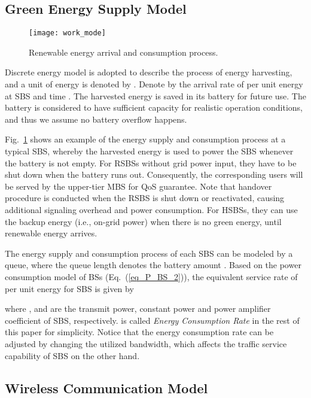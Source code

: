 \documentclass[12pt, draftclsnofoot,onecolumn]{IEEEtran}
\begin{document}
\subsection{Green Energy Supply Model}

\begin{figure}
\centering
  \texttt{[image: work\_mode]}\\
  \caption{Renewable energy arrival and consumption process.}\label{fig_work_mode}
\end{figure}

Discrete energy model is adopted to describe the process of energy harvesting, and a unit of energy is denoted by  \cite{xiaoxia_EH_d2d}.
Denote by  the arrival rate of per unit energy at SBS and time .
The harvested energy is saved in its battery for future use.
The battery is considered to have sufficient capacity for realistic operation conditions, and thus we assume no battery overflow happens.

Fig.~\ref{fig_work_mode} shows an example of the energy supply and consumption process at a typical SBS, whereby the harvested energy is used to power the SBS whenever the battery is not empty.
For RSBSs without grid power input, they have to be shut down when the battery runs out.
Consequently, the corresponding users will be served by the upper-tier MBS for QoS guarantee.
Note that handover procedure is conducted when the RSBS is shut down or reactivated, causing additional signaling overhead and power consumption.
For HSBSs, they can use the backup energy (i.e., on-grid power) when there is no green energy, until renewable energy arrives.

The energy supply and consumption process of each SBS can be modeled by a queue, where the queue length denotes the battery amount \cite{EH_single_link_2}.
Based on the power consumption model of BSs (Eq.~(\ref{eq_P_BS_2})),  the equivalent service rate of per unit energy for SBS is given by

where ,  and  are the transmit power, constant power and power amplifier coefficient of SBS, respectively.
 is called \emph{Energy Consumption Rate} in the rest of this paper for simplicity.
Notice that the energy consumption rate can be adjusted by changing the utilized bandwidth, which affects the traffic service capability of SBS on the other hand.

	\subsection{Wireless Communication Model}
\end{document}
